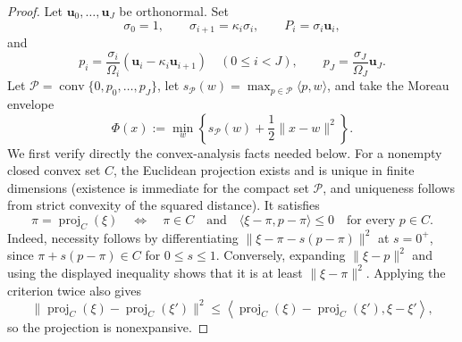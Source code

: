 \documentclass[11pt]{article}
\theoremstyle{definition}
\theoremstyle{remark}
\begin{document}
\begin{proof}
Let \(\mathbf u_0,\ldots,\mathbf u_J\) be orthonormal.  Set
\[
 \sigma_0=1,\qquad
 \sigma_{i+1}=\kappa_i\sigma_i,\qquad
 P_i=\sigma_i\mathbf u_i,
\]
and
\[
 p_i=\frac{\sigma_i}{\Omega_i}
      (\mathbf u_i-\kappa_i\mathbf u_{i+1})
 \quad(0\le i<J),
 \qquad
 p_J=\frac{\sigma_J}{\Omega_J}\mathbf u_J.
\]
Let \(\mathcal P=\operatorname{conv}\{0,p_0,\ldots,p_J\}\), let
\(s_{\mathcal P}(w)=\max_{p\in\mathcal P}\langle p,w\rangle\), and take the Moreau
envelope
\begin{equation}
 \Phi(x):=\min_w\left\{s_{\mathcal P}(w)+\frac12\|x-w\|^2\right\}.
 \label{eq:moreau-F}
\end{equation}
We first verify directly the convex-analysis facts needed below.  For a
nonempty closed convex set \(C\), the Euclidean projection exists and is
unique in finite dimensions (existence is immediate for the compact set
\(\mathcal P\), and uniqueness follows from strict convexity of the squared
distance).  It satisfies
\begin{equation}
 \pi=\operatorname{proj}_{C}(\xi)
 \quad\Longleftrightarrow\quad
 \pi\in C
 \quad\text{and}\quad
 \langle \xi-\pi,p-\pi\rangle\le0\quad\text{for every }p\in C.
 \label{eq:projection-criterion}
\end{equation}
Indeed, necessity follows by differentiating
\(\|\xi-\pi-s(p-\pi)\|^2\) at \(s=0^+\), since
\(\pi+s(p-\pi)\in C\) for \(0\le s\le1\).  Conversely, expanding
\(\|\xi-p\|^2\) and using the displayed inequality shows that it is at
least \(\|\xi-\pi\|^2\).  Applying the criterion twice also gives
\begin{equation}
 \|\operatorname{proj}_C(\xi)-\operatorname{proj}_C(\xi')\|^2
 \le
 \left\langle
  \operatorname{proj}_C(\xi)-\operatorname{proj}_C(\xi'),
  \xi-\xi'
 \right\rangle,
 \label{eq:projection-nonexpansive}
\end{equation}
so the projection is nonexpansive.


\end{proof}
\end{document}
